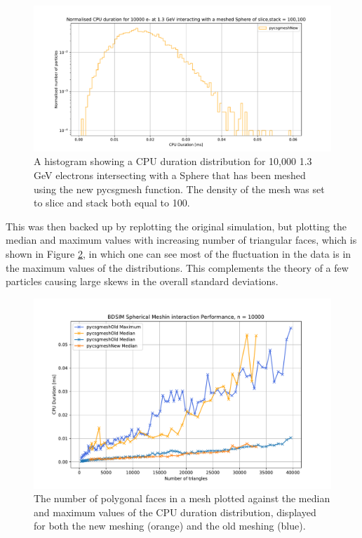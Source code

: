 \documentclass[12pt,a4paper]{article}
\begin{document}
\begin{figure}[h!]
\centering
\includegraphics[scale=0.5]{Images//CPU//Pythonhist1.pdf}
\caption[width=\columnwidth]{A  histogram showing a CPU duration distribution for 10,000 1.3 GeV electrons intersecting with a Sphere that has been meshed using the new pycsgmesh function. The density of the mesh was set to slice and stack both equal to 100.}
\label{disty}
\end{figure}

\noindent This was then backed up by replotting the original simulation, but plotting the median and maximum values with increasing number of triangular faces, which is shown in Figure \ref{mednmax}, in which one can see most of the fluctuation in the data is in the maximum values of the distributions. This complements the theory of a few particles causing large skews in the overall standard deviations.

\begin{figure}[h!]
\centering
\includegraphics[scale=0.6]{Images//CPU//mednmax.pdf}
\caption[width=\columnwidth]{The number of polygonal faces in a mesh plotted against the median and maximum values of the CPU duration distribution, displayed for both the new meshing (orange)  and the old meshing (blue).}
\label{mednmax}
\end{figure}
\end{document}
